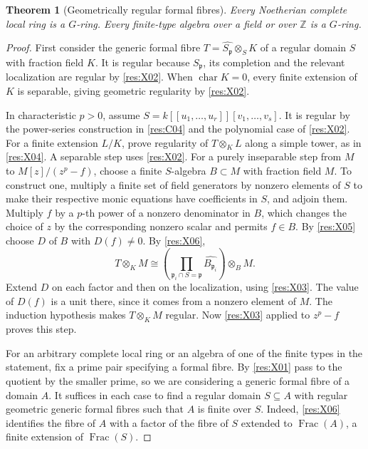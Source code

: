 \documentclass[11pt,oneside,openany]{book}
\newtheorem{theorem}{Theorem}[chapter]
\theoremstyle{definition}
\theoremstyle{remark}
\begin{document}
\begin{theorem}[Geometrically regular formal fibres]\label{res:X07}
Every Noetherian complete local ring is a \(G\)-ring. Every finite-type algebra over a field or over \(\mathbb Z\) is a \(G\)-ring.
\end{theorem}
\begin{proof}
First consider the generic formal fibre \(T=\widehat{S_{\mathfrak p}}\otimes_S K\) of a regular domain \(S\) with fraction field \(K\). It is regular because \(S_{\mathfrak p}\), its completion and the relevant localization are regular by \ref{res:X02}. When \(\operatorname{char}K=0\), every finite extension of \(K\) is separable, giving geometric regularity by \ref{res:X02}.

In characteristic \(p>0\), assume \(S=k[[u_1,\dots,u_r]][v_1,\dots,v_s]\). It is regular by the power-series construction in \ref{res:C04} and the polynomial case of \ref{res:X02}. For a finite extension \(L/K\), prove regularity of \(T\otimes_K L\) along a simple tower, as in \ref{res:X04}. A separable step uses \ref{res:X02}. For a purely inseparable step from \(M\) to \(M[z]/(z^p-f)\), choose a finite \(S\)-algebra \(B\subset M\) with fraction field \(M\). To construct one, multiply a finite set of field generators by nonzero elements of \(S\) to make their respective monic equations have coefficients in \(S\), and adjoin them. Multiply \(f\) by a \(p\)-th power of a nonzero denominator in \(B\), which changes the choice of \(z\) by the corresponding nonzero scalar and permits \(f\in B\). By \ref{res:X05} choose \(D\) of \(B\) with \(D(f)\ne0\). By \ref{res:X06},
\[
 T\otimes_K M\cong
 \left(\prod_{\mathfrak p_i\cap S=\mathfrak p}\widehat{B_{\mathfrak p_i}}\right)
                       \otimes_B M .
\]
Extend \(D\) on each factor and then on the localization, using \ref{res:X03}. The value of \(D(f)\) is a unit there, since it comes from a nonzero element of \(M\). The induction hypothesis makes \(T\otimes_K M\) regular. Now \ref{res:X03} applied to \(z^p-f\) proves this step.

For an arbitrary complete local ring or an algebra of one of the finite types in the statement, fix a prime pair specifying a formal fibre. By \ref{res:X01} pass to the quotient by the smaller prime, so we are considering a generic formal fibre of a domain \(A\). It suffices in each case to find a regular domain \(S\subseteq A\) with regular geometric generic formal fibres such that \(A\) is finite over \(S\). Indeed, \ref{res:X06} identifies the fibre of \(A\) with a factor of the fibre of \(S\) extended to \(\operatorname{Frac}(A)\), a finite extension of \(\operatorname{Frac}(S)\).


\end{proof}
\end{document}
